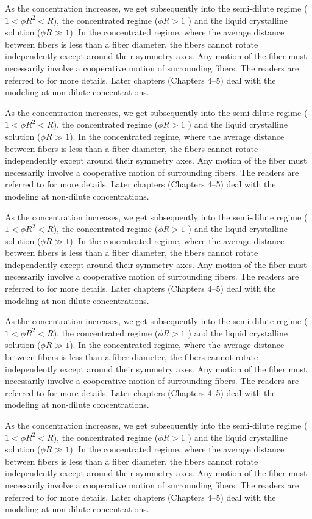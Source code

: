 \documentclass[english,fleqn,allpages]{ISTE_science}[2018/07/30]
\begin{document}
\begin{encadre}

As the concentration increases, we get subsequently into the semi-dilute
regime ($1<\phi R^{2}<R$), the concentrated regime ($\phi R>1$ )
and the liquid crystalline solution ($\phi R\gg1$). In the concentrated
regime, where the average distance between fibers is less than a fiber
diameter, the fibers cannot rotate independently except around their
symmetry axes. Any motion of the fiber must necessarily involve a
cooperative motion of surrounding fibers. The readers are referred
to \cite{doi88} for more details. Later chapters (Chapters 4--5) deal with
the modeling at non-dilute concentrations.


As the concentration increases, we get subsequently into the semi-dilute
regime ($1<\phi R^{2}<R$), the concentrated regime ($\phi R>1$ )
and the liquid crystalline solution ($\phi R\gg1$). In the concentrated
regime, where the average distance between fibers is less than a fiber
diameter, the fibers cannot rotate independently except around their
symmetry axes. Any motion of the fiber must necessarily involve a
cooperative motion of surrounding fibers. The readers are referred
to \cite{doi88} for more details. Later chapters (Chapters 4--5) deal with
the modeling at non-dilute concentrations.


As the concentration increases, we get subsequently into the semi-dilute
regime ($1<\phi R^{2}<R$), the concentrated regime ($\phi R>1$ )
and the liquid crystalline solution ($\phi R\gg1$). In the concentrated
regime, where the average distance between fibers is less than a fiber
diameter, the fibers cannot rotate independently except around their
symmetry axes. Any motion of the fiber must necessarily involve a
cooperative motion of surrounding fibers. The readers are referred
to \cite{doi88} for more details. Later chapters (Chapters 4--5) deal with
the modeling at non-dilute concentrations.


As the concentration increases, we get subsequently into the semi-dilute
regime ($1<\phi R^{2}<R$), the concentrated regime ($\phi R>1$ )
and the liquid crystalline solution ($\phi R\gg1$). In the concentrated
regime, where the average distance between fibers is less than a fiber
diameter, the fibers cannot rotate independently except around their
symmetry axes. Any motion of the fiber must necessarily involve a
cooperative motion of surrounding fibers. The readers are referred
to \cite{doi88} for more details. Later chapters (Chapters 4--5) deal with
the modeling at non-dilute concentrations.


As the concentration increases, we get subsequently into the semi-dilute
regime ($1<\phi R^{2}<R$), the concentrated regime ($\phi R>1$ )
and the liquid crystalline solution ($\phi R\gg1$). In the concentrated
regime, where the average distance between fibers is less than a fiber
diameter, the fibers cannot rotate independently except around their
symmetry axes. Any motion of the fiber must necessarily involve a
cooperative motion of surrounding fibers. The readers are referred
to \cite{doi88} for more details. Later chapters (Chapters 4--5) deal with
the modeling at non-dilute concentrations.
\end{encadre}
\end{document}
